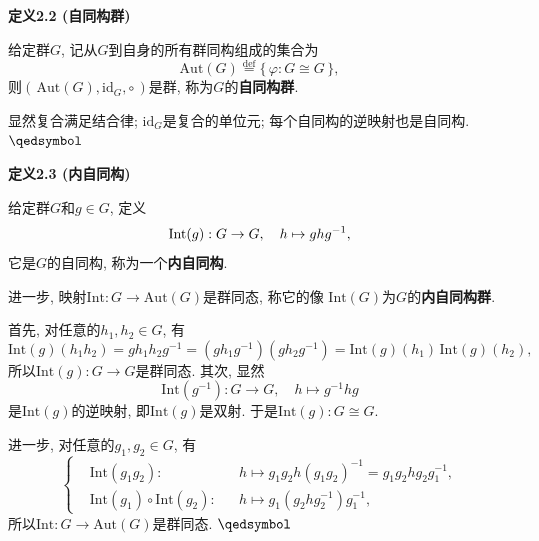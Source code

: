 \documentclass[UTF8]{ctexart}
\begin{document}
\vspace{10pt}

\hypertarget{sec:定义2.2}{}
\noindent\textbf{定义2.2 (自同构群)}

给定群$G$, 记从$G$到自身的所有群同构组成的集合为
\[
    \mathrm{Aut}(G)\overset{\mathrm{def}}{=}\{\,\varphi:G\cong G\,\},
\]
则$(\,\mathrm{Aut}(G),\mathrm{id}_G,\circ\,)$是群, 称为$G$的\textbf{自同构群}.


显然复合满足结合律; $\mathrm{id}_G$是复合的单位元; 每个自同构的逆映射也是自同构.
\hfill $\qedsymbol$

\vspace{10pt}

\hypertarget{sec:定义2.3}{}
\noindent\textbf{定义2.3 (内自同构)}

给定群$G$和$g\in G$, 定义
\vspace{-3pt}
\[
    \mathrm{Int}(g):G\to G,\quad h\mapsto ghg^{-1},\\[-3pt]
\]
它是$G$的自同构, 称为一个\textbf{内自同构}.

进一步, 映射$\mathrm{Int}:G\to\mathrm{Aut}(G)$是群同态, 称它的像
$\mathrm{Int}(G)$为$G$的\textbf{内自同构群}.


首先, 对任意的$h_1,h_2\in G$, 有
\[
    \mathrm{Int}(g)(h_1h_2)=gh_1h_2g^{-1}=(gh_1g^{-1})(gh_2g^{-1})
    =\mathrm{Int}(g)(h_1)\,\mathrm{Int}(g)(h_2),
\]
所以$\mathrm{Int}(g):G\to G$是群同态. 其次, 显然
\[
    \mathrm{Int}(g^{-1}):G\to G,\quad h\mapsto g^{-1}hg
\]
是$\mathrm{Int}(g)$的逆映射, 即$\mathrm{Int}(g)$是双射.
于是$\mathrm{Int}(g):G\cong G$.

进一步, 对任意的$g_1,g_2\in G$, 有
\[\left\{\begin{aligned}
    &\mathrm{Int}(g_1g_2):&&h\mapsto
    g_1g_2h(g_1g_2)^{-1}=g_1g_2hg_2g_1^{-1},\\[-3pt]
    &\mathrm{Int}(g_1)\circ\mathrm{Int}(g_2):&&h\mapsto
    g_1(g_2hg_2^{-1})g_1^{-1},
\end{aligned}\right.\]
所以$\mathrm{Int}:G\to\mathrm{Aut}(G)$是群同态. \hfill $\qedsymbol$
\end{document}
